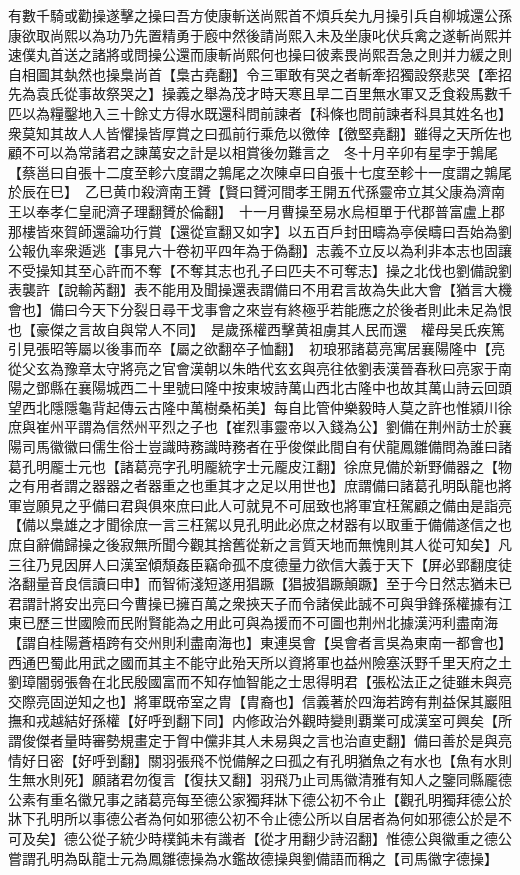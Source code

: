 有數千騎或勸操遂擊之操曰吾方使康斬送尚熙首不煩兵矣九月操引兵自柳城還公孫康欲取尚熙以為功乃先置精勇于廏中然後請尚熙入未及坐康叱伏兵禽之遂斬尚熙并速僕丸首送之諸將或問操公還而康斬尚熙何也操曰彼素畏尚熙吾急之則并力緩之則自相圖其埶然也操梟尚首【梟古堯翻】令三軍敢有哭之者斬牽招獨設祭悲哭【牽招先為袁氏從事故祭哭之】操義之舉為茂才時天寒且旱二百里無水軍又乏食殺馬數千匹以為糧鑿地入三十餘丈方得水既還科問前諫者【科條也問前諫者科具其姓名也】衆莫知其故人人皆懼操皆厚賞之曰孤前行乘危以徼倖【徼堅堯翻】雖得之天所佐也顧不可以為常諸君之諫萬安之計是以相賞後勿難言之　冬十月辛卯有星孛于鶉尾【蔡邕曰自張十二度至軫六度謂之鶉尾之次陳卓曰自張十七度至軫十一度謂之鶉尾於辰在巳】　乙巳黄巾殺濟南王贇【賢曰贇河間孝王開五代孫靈帝立其父康為濟南王以奉孝仁皇祀濟子理翻贇於倫翻】　十一月曹操至易水烏桓單于代郡普富盧上郡那樓皆來賀師還論功行賞【還從宣翻又如字】以五百戶封田疇為亭侯疇曰吾始為劉公報仇率衆遁逃【事見六十卷初平四年為于偽翻】志義不立反以為利非本志也固讓不受操知其至心許而不奪【不奪其志也孔子曰匹夫不可奪志】操之北伐也劉備說劉表襲許【說輸芮翻】表不能用及聞操還表謂備曰不用君言故為失此大會【猶言大機會也】備曰今天下分裂日尋干戈事會之來豈有終極乎若能應之於後者則此未足為恨也【豪傑之言故自與常人不同】　是歲孫權西擊黄祖虜其人民而還　權母吴氏疾篤引見張昭等屬以後事而卒【屬之欲翻卒子恤翻】　初琅邪諸葛亮寓居襄陽隆中【亮從父玄為豫章太守將亮之官會漢朝以朱皓代玄玄與亮往依劉表漢晉春秋曰亮家于南陽之鄧縣在襄陽城西二十里號曰隆中按東坡詩萬山西北古隆中也故其萬山詩云回頭望西北隱隱龜背起傳云古隆中萬樹桑柘美】每自比管仲樂毅時人莫之許也惟潁川徐庶與崔州平謂為信然州平烈之子也【崔烈事靈帝以入錢為公】劉備在荆州訪士於襄陽司馬徽徽曰儒生俗士豈識時務識時務者在乎俊傑此間自有伏龍鳳雛備問為誰曰諸葛孔明龎士元也【諸葛亮字孔明龎統字士元龎皮江翻】徐庶見備於新野備器之【物之有用者謂之器器之者器重之也重其才之足以用世也】庶謂備曰諸葛孔明臥龍也將軍豈願見之乎備曰君與俱來庶曰此人可就見不可屈致也將軍宜枉駕顧之備由是詣亮【備以梟雄之才聞徐庶一言三枉駕以見孔明此必庶之材器有以取重于備備遂信之也庶自辭備歸操之後寂無所聞今觀其捨舊從新之言質天地而無愧則其人從可知矣】凡三往乃見因屏人曰漢室傾頹姦臣竊命孤不度德量力欲信大義于天下【屏必郢翻度徒洛翻量音良信讀曰申】而智術淺短遂用猖蹶【猖披猖蹶顛蹶】至于今日然志猶未已君謂計將安出亮曰今曹操已擁百萬之衆挾天子而令諸侯此誠不可與爭鋒孫權據有江東已歷三世國險而民附賢能為之用此可與為援而不可圖也荆州北據漢沔利盡南海【謂自桂陽蒼梧跨有交州則利盡南海也】東連吳會【吳會者言吳為東南一都會也】西通巴蜀此用武之國而其主不能守此殆天所以資將軍也益州險塞沃野千里天府之土劉璋闇弱張魯在北民殷國富而不知存恤智能之士思得明君【張松法正之徒雖未與亮交際亮固逆知之也】將軍既帝室之胄【胄裔也】信義著於四海若跨有荆益保其巖阻撫和戎越結好孫權【好呼到翻下同】内修政治外觀時變則覇業可成漢室可興矣【所謂俊傑者量時審勢規畫定于胷中儻非其人未易與之言也治直吏翻】備曰善於是與亮情好日密【好呼到翻】關羽張飛不悦備解之曰孤之有孔明猶魚之有水也【魚有水則生無水則死】願諸君勿復言【復扶又翻】羽飛乃止司馬徽清雅有知人之鑒同縣龎德公素有重名徽兄事之諸葛亮每至德公家獨拜牀下德公初不令止【觀孔明獨拜德公於牀下孔明所以事德公者為何如邪德公初不令止德公所以自居者為何如邪德公於是不可及矣】德公從子統少時樸鈍未有識者【從才用翻少詩沼翻】惟德公與徽重之德公嘗謂孔明為臥龍士元為鳳雛德操為水鑑故德操與劉備語而稱之【司馬徽字德操】

